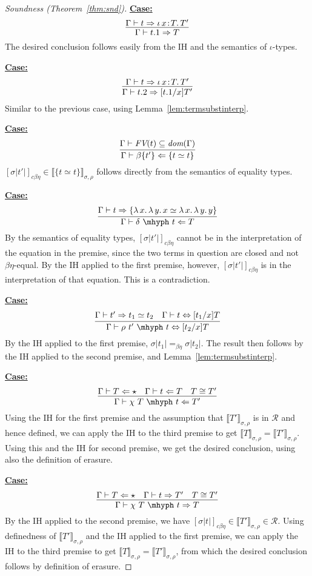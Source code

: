 \documentclass{article}
\newcommand{\abs}[4]{{#1}\, #2\! : \! #3.\, #4}
\newcommand{\absu}[3]{{#1}\, #2.\, #3}
\newcommand{\interp}[1]{\llbracket #1 \rrbracket}
\newcommand{\tpcheck}[0]{\Leftarrow}
\newcommand{\tpsynth}[0]{\Rightarrow}
\newcommand{\cbe}[0]{c\beta\eta}
\newcommand{\startcase}[1]{\vspace{#1} \noindent\textbf{\underline{Case:}}}
\begin{document}
\begin{proof}[Soundness (Theorem~\ref{thm:snd})]
\startcase{.2cm}
\[
   \infer{\Gamma\vdash t.1 \tpsynth T}{\Gamma\vdash t \tpsynth \abs{\iota}{x}{T}{T'}} 
\]
The desired conclusion follows easily from the IH and the semantics of $\iota$-types.

\startcase{.2cm}
\[
    \infer{\Gamma\vdash t.2 \tpsynth [t.1/x]T'}{\Gamma\vdash t \tpsynth \abs{\iota}{x}{T}{T'}} 
\]
Similar to the previous case, using Lemma~\ref{lem:termsubstinterp}.

\startcase{.2cm}
\[
    \infer{\Gamma\vdash \beta\{t'\} \tpcheck \{ t \simeq t \}}{\Gamma\vdash \textit{FV}(t)\subseteq \textit{dom}(\Gamma)}  
\]
$[\sigma|t'|]_{\cbe}\in\interp{\{ t \simeq t \}}_{\sigma,\rho}$ follows directly from the semantics of equality types.

\startcase{.2cm}
\[
    \infer{\Gamma\vdash \delta\ \mhyph\ t \tpcheck T}{\Gamma\vdash t\tpsynth \{ \absu{\lambda}{x}{\absu{\lambda}{y}{x}} \simeq \absu{\lambda}{x}{\absu{\lambda}{y}{y}}\}}  
\]
By the semantics of equality types, $[\sigma|t'|]_{\cbe}$ cannot be in the interpretation of the equation in the premise,
since the two terms in question are closed and not $\beta\eta$-equal.  By the IH applied to the first premise, however,
$[\sigma|t'|]_{\cbe}$ is in the interpretation of that equation.  This is a contradiction.

\startcase{.2cm}
\[
    \infer{\Gamma\vdash \rho\ t'\ \mhyph\ t \Leftrightarrow [t_2/x]T}
          {\Gamma\vdash t' \tpsynth t_1 \simeq t_2 & \Gamma \vdash t \Leftrightarrow [t_1/x]T} 
\]
By the IH applied to the first premise, $\sigma|t_1| =_{\beta\eta} \sigma|t_2|$.  The result then follows by the IH applied to the second premise,
and Lemma~\ref{lem:termsubstinterp}.

\startcase{.2cm}
\[
    \infer{\Gamma\vdash \chi\ T\ \mhyph\ t \tpcheck T'}
          {\Gamma\vdash T\tpcheck \star & \Gamma\vdash t \tpcheck T & T \cong T'} 
\]
Using the IH for the first premise and the assumption that $\interp{T'}_{\sigma,\rho}$ is in $\mathcal{R}$ and hence defined,
we can apply the IH to the third premise to get $\interp{T}_{\sigma,\rho} = \interp{T'}_{\sigma,\rho}$.  Using this and the IH for second premise,
we get the desired conclusion, using also the definition of erasure.

\startcase{.2cm}
\[
    \infer{\Gamma\vdash \chi\ T\ \mhyph\ t \tpsynth T}
          {\Gamma\vdash T\tpcheck \star & \Gamma\vdash t \tpsynth T' & T \cong T'} 
\]
By the IH applied to the second premise, we have $[\sigma|t|]_{\cbe}\in\interp{T'}_{\sigma,\rho}\in\mathcal{R}$.
Using definedness of $\interp{T'}_{\sigma,\rho}$ and the IH applied to the first premise, we can apply the
IH to the third premise to get $\interp{T}_{\sigma,\rho} = \interp{T'}_{\sigma,\rho}$, from which the desired
conclusion follows by definition of erasure.


\end{proof}
\end{document}
